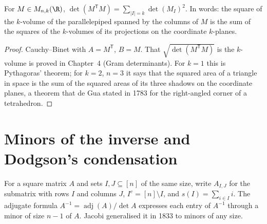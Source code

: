 \begin{corollary}\label{cor:pythagoras}
For $M\in M_{n,k}(\R)$, $\det(M^{\mathsf T}M)=\sum_{|I|=k}\det(M_I)^2$. In words: the square of the $k$-volume of the
parallelepiped spanned by the columns of $M$ is the sum of the squares of the $k$-volumes of its projections on the
coordinate $k$-planes.
\end{corollary}
\begin{proof}
Cauchy--Binet with $A=M^{\mathsf T}$, $B=M$. That $\sqrt{\det(M^{\mathsf T}M)}$ is the $k$-volume is proved in Chapter~4
(Gram determinants). For $k=1$ this is Pythagoras' theorem; for $k=2$, $n=3$ it says that the squared area of a
triangle in space is the sum of the squared areas of its three shadows on the coordinate planes, a theorem that de Gua
stated in 1783 for the right-angled corner of a tetrahedron.
\end{proof}

\section{Minors of the inverse and Dodgson's condensation}\label{sec:condensation}

For a square matrix $A$ and sets $I,J\subseteq[n]$ of the same size, write $A_{I,J}$ for the submatrix with rows $I$ and
columns $J$, $I^c=[n]\setminus I$, and $s(I)=\sum_{i\in I}i$. The adjugate formula $A^{-1}=\operatorname{adj}(A)/\det A$
expresses each entry of $A^{-1}$ through a minor of size $n-1$ of $A$. Jacobi generalised it in 1833 to minors of any size.

